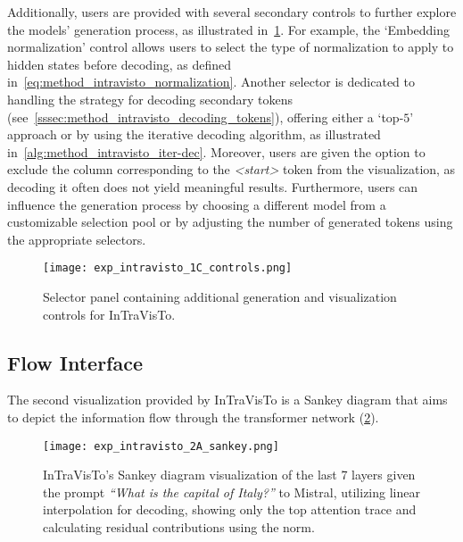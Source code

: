 Additionally, users are provided with several secondary controls to further explore the models' generation process, as illustrated in~\cref{fig:exp_intravisto_1_C}.
For example, the `Embedding normalization' control allows users to select the type of normalization to apply to hidden states before decoding, as defined in~\cref{eq:method_intravisto_normalization}.
Another selector is dedicated to handling the strategy for decoding secondary tokens (see~\cref{sssec:method_intravisto_decoding_tokens}), offering either a `top-$5$' approach or by using the iterative decoding algorithm, as illustrated in~\cref{alg:method_intravisto_iter-dec}.
Moreover, users are given the option to exclude the column corresponding to the \emph{<start>} token from the visualization, as decoding it often does not yield meaningful results.
Furthermore, users can influence the generation process by choosing a different model from a customizable selection pool or by adjusting the number of generated tokens using the appropriate selectors.

\begin{figure}[t!]
    \centering
    \texttt{[image: exp\_intravisto\_1C\_controls.png]}
    \caption{Selector panel containing additional generation and visualization controls for InTraVisTo.}
    \label{fig:exp_intravisto_1_C}
\end{figure}

\subsection{Flow Interface}\label{ssec:exp_intravisto_exp2}

The second visualization provided by InTraVisTo is a Sankey diagram that aims to depict the information flow through the transformer network (\cref{fig:exp_intravisto_2_A}).

\begin{figure}[t!]
    \centering
    \texttt{[image: exp\_intravisto\_2A\_sankey.png]}
    \caption[InTraVisTo's Sankey diagram visualization given the prompt \emph{``What is the capital of Italy?''} to Mistral.]{InTraVisTo's Sankey diagram visualization of the last 7 layers given the prompt \emph{``What is the capital of Italy?''} to Mistral, utilizing linear interpolation for decoding, showing only the top attention trace and calculating residual contributions using the norm.}
    \label{fig:exp_intravisto_2_A}
\end{figure}

